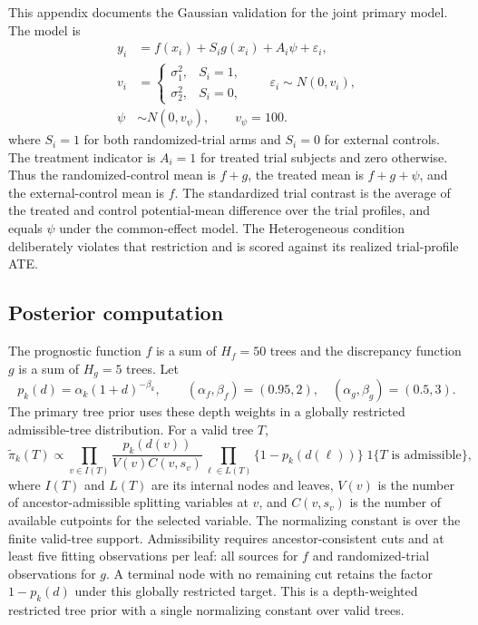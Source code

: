 \documentclass[11pt]{article}
\theoremstyle{remark}\newtheorem{remark}{Remark}[section]
\providecommand{\DIFaddtex}[1]{{\protect\color{blue} \sf #1}} %
\providecommand{\DIFadd}[1]{\texorpdfstring{\DIFaddtex{#1}}{#1}} %
\begin{document}
\DIFadd{This appendix documents the Gaussian validation for the joint primary model. The model is
}\begin{equation}
\begin{aligned}
 y_i&=f(x_i)+S_i g(x_i)+A_i\psi+\varepsilon_i,\\
 v_i&=\begin{cases}
 \sigma_1^2,&S_i=1,\\
 \sigma_2^2,&S_i=0,
 \end{cases}
 \qquad \varepsilon_i\sim N(0,v_i),\\
 \psi&\sim N(0,v_\psi),\qquad v_\psi=100.
\end{aligned}
 \label{eq:joint_app_model}
\end{equation}
\DIFadd{where $S_i=1$ for both randomized-trial arms and $S_i=0$ for external controls. The treatment indicator is $A_i=1$ for treated trial subjects and zero otherwise. Thus the randomized-control mean is $f+g$, the treated mean is $f+g+\psi$, and the external-control mean is $f$. The standardized trial contrast is the average of the treated and control potential-mean difference over the trial profiles, and equals $\psi$ under the common-effect model. The Heterogeneous condition deliberately violates that restriction and is scored against its realized trial-profile ATE.
}

\subsection{\DIFadd{Posterior computation}}

\DIFadd{The prognostic function $f$ is a sum of $H_f=50$ trees and the discrepancy function $g$ is a sum of $H_g=5$ trees. Let
}\[
 p_k(d)=\alpha_k(1+d)^{-\beta_k},\qquad
 (\alpha_f,\beta_f)=(0.95,2),\quad (\alpha_g,\beta_g)=(0.5,3).
\]
\DIFadd{The primary tree prior uses these depth weights in a globally restricted admissible-tree distribution. For a valid tree $T$,
}\begin{equation}
 \widetilde\pi_k(T)\propto
 \prod_{v\in I(T)}\frac{p_k(d(v))}{V(v)C(v,s_v)}
 \prod_{\ell\in L(T)}\{1-p_k(d(\ell))\}
 \;1\{T\text{ is admissible}\},
 \label{eq:joint_treeweight}
\end{equation}
\DIFadd{where $I(T)$ and $L(T)$ are its internal nodes and leaves, $V(v)$ is the number of ancestor-admissible splitting variables at $v$, and $C(v,s_v)$ is the number of available cutpoints for the selected variable. The normalizing constant is over the finite valid-tree support. Admissibility requires ancestor-consistent cuts and at least five fitting observations per leaf: all sources for $f$ and randomized-trial observations for $g$. A terminal node with no remaining cut retains the factor $1-p_k(d)$ under this globally restricted target. This is a depth-weighted restricted tree prior with a single normalizing constant over valid trees.
}
\end{document}
